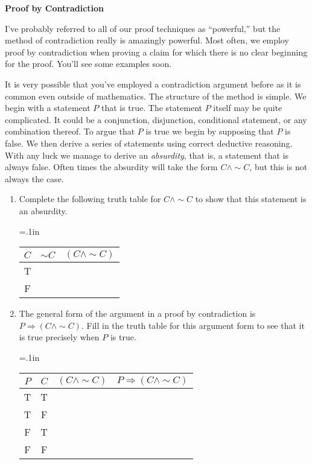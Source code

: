 \documentclass[12 pt]{article}
\theoremstyle{definition}
\theoremstyle{plain}
\theoremstyle{mytheorem}
\theoremstyle{myexample}
\theoremstyle{mydefinition}
\begin{document}
\begin{center}
\textbf{Proof by Contradiction}
\end{center}

I've probably referred to all of our proof techniques as ``powerful,'' but the method of contradiction really is amazingly powerful.  Most often, we employ proof by contradiction when proving a claim for which there is no clear beginning for the proof.  You'll see some examples soon.
\begin{center}
\end{center}

\noindent It is very possible that you've employed a contradiction argument before as it is common even outside of mathematics.  The structure of the method is simple.  We begin with a statement $P$ that is true.  The statement $P$ itself may be quite complicated.  It could be a conjunction, disjunction, conditional statement, or any combination thereof.  To argue that $P$ is true we begin by supposing that $P$ is false.  We then derive a series of statements using correct deductive reasoning.  With any luck we manage to derive an \textit{absurdity}, that is, a statement that is always false.  Often times the absurdity will take the form $C \wedge \sim C$, but this is not always the case.

\begin{enumerate}
\item Complete the following truth table for $C \wedge \sim C$ to show that this statement is an absurdity.\\
	{\tabulinesep=.1in
	\begin{tabu}{c|c:c}
	$C$ & $\sim C$ & $(C \wedge \sim C)$\\
	\hline
	T & \ & \ \\
	F & \ & \ \\
	\end{tabu}}
	
\item The general form of the argument in a proof by contradiction is $P \Rightarrow (C \wedge \sim C)$.  Fill in the truth table for this argument form to see that it is true precisely when $P$ is true.\\
	{\tabulinesep=.1in
	\begin{tabu}{cc|c:c}
	$P$ & $C$ & $(C \wedge \sim C)$ & $P \Rightarrow (C \wedge \sim C)$\\
	\hline
	T & T & \ & \ \\
	T & F & \ & \ \\
	F & T & \ & \ \\
	F & F & \ & \ \\
	\end{tabu}
	}
\end{enumerate} 
\end{document}
